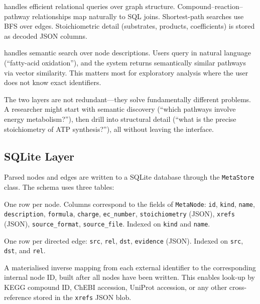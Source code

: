 \documentclass[10pt]{article}
\begin{document}
\begin{description}[leftmargin=*,itemsep=3pt]
\item[SQLite] handles efficient relational queries over graph structure.
  Compound--reaction--pathway relationships map naturally to SQL joins.
  Shortest-path searches use BFS over edges. Stoichiometric detail
  (substrates, products, coefficients) is stored as decoded JSON columns.

\item[LanceDB + embeddings] handles semantic search over node descriptions.
  Users query in natural language (``fatty-acid oxidation''), and the system
  returns semantically similar pathways via vector similarity. This matters
  most for exploratory analysis where the user does not know exact identifiers.
\end{description}

The two layers are not redundant---they solve fundamentally different
problems. A researcher might start with semantic discovery (``which pathways
involve energy metabolism?''), then drill into structural detail (``what is the
precise stoichiometry of ATP synthesis?''), all without leaving the interface.

\subsection{SQLite Layer}

Parsed nodes and edges are written to a SQLite database through the
\texttt{MetaStore} class. The schema uses three tables:

\begin{description}[leftmargin=*,itemsep=2pt]
  \item[\texttt{meta\_nodes}] One row per node. Columns correspond to the
    fields of \texttt{MetaNode}: \texttt{id}, \texttt{kind}, \texttt{name},
    \texttt{description}, \texttt{formula}, \texttt{charge},
    \texttt{ec\_number}, \texttt{stoichiometry} (JSON), \texttt{xrefs}
    (JSON), \texttt{source\_format}, \texttt{source\_file}. Indexed on
    \texttt{kind} and \texttt{name}.
  \item[\texttt{meta\_edges}] One row per directed edge: \texttt{src},
    \texttt{rel}, \texttt{dst}, \texttt{evidence} (JSON). Indexed on
    \texttt{src}, \texttt{dst}, and \texttt{rel}.
  \item[\texttt{xref\_index}] A materialised inverse mapping from each
    external identifier to the corresponding internal node ID, built after
    all nodes have been written. This enables look-up by KEGG compound ID,
    ChEBI accession, UniProt accession, or any other cross-reference stored
    in the \texttt{xrefs} JSON blob.
\end{description}
\end{document}
